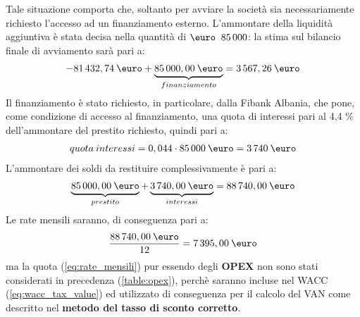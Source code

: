Tale situazione comporta che, soltanto per avviare la società sia necessariamente richiesto l'accesso ad un finanziamento esterno. \newline L'ammontare della liquidità aggiuntiva è stata decisa nella quantità di $\mbox{\euro \:85\thinspace 000}$: la stima sul bilancio finale di avviamento sarà pari a:
	\begin{equation}
	\label{eq:bilancio_finale_installazione}
	\begin{split}
		-81\thinspace 432,74 \: \mbox{\euro} + \underbrace{85\thinspace 000,00 \: \mbox{\euro}}_{finanziamento} = 3\thinspace 567,26 \: \mbox{\euro}
 	\end{split}
	\end{equation}
Il finanziamento è stato richiesto, in particolare, dalla \ac{Fibank Albania}, che pone, come condizione di accesso al finanziamento, una quota di interessi pari al 4,4 \% dell'ammontare del prestito richiesto, quindi pari a:
	\begin{equation}
	\label{eq:interessi_fibank}
	\begin{split}
		quota \: interessi = 0,044 \cdot 85\thinspace 000 \: \mbox{\euro} = 3\thinspace 740 \:\mbox{\euro} 
	\end{split}
	\end{equation}
L'ammontare dei soldi da restituire complessivamente è pari a:
	\begin{equation}
	\label{eq:somma_restituita}
	\begin{split}
		\underbrace{85\thinspace 000,00 \: \mbox{\euro}}_{prestito} + 
		\underbrace{3\thinspace 740,00 \: \mbox{\euro}}_{interessi} = 
		88\thinspace 740,00 \: \mbox{\euro}
	\end{split}
	\end{equation}
Le rate mensili saranno, di conseguenza pari a:
 	\begin{equation}
	\label{eq:rate_mensili}
	\begin{split}
		\frac{88\thinspace 740,00 \: \mbox{\euro}}{12} = 7\thinspace 395,00 \: \mbox{\euro}
	\end{split}
	\end{equation}
ma la quota (\ref{eq:rate_mensili}) pur essendo degli \textbf{OPEX} non sono stati considerati in precedenza (\ref{table:opex}), perchè saranno incluse nel \ac{WACC} (\ref{eq:wacc_tax_value}) ed utilizzato di conseguenza per il calcolo del \ac{VAN} come descritto nel \textbf{metodo del tasso di sconto corretto}.	

